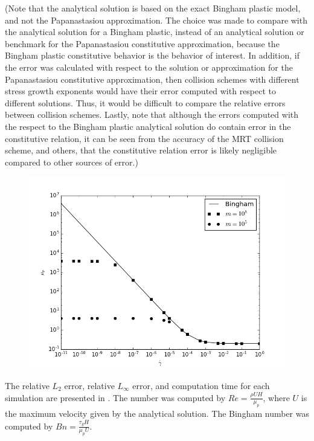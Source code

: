 (Note that the analytical solution is based on the exact Bingham plastic model, and not the Papanastasiou approximation.
The choice was made to compare with the analytical solution for a Bingham plastic, instead of an analytical solution or benchmark for the Papanastasiou constitutive approximation, because the Bingham plastic constitutive behavior is the behavior of interest. In addition, if the error was calculated with respect to the solution or approximation for the Papanastasiou constitutive approximation, then collision schemes with different stress growth exponents would have their error computed with respect to different solutions. Thus, it would be difficult to compare the relative errors between collision schemes. Lastly, note that although the errors computed with the respect to the Bingham plastic analytical solution do contain error in the constitutive relation, it can be seen from the accuracy of the MRT collision scheme, and others, that the constitutive relation error is likely negligible compared to other sources of error.)

\DIFaddbegin \begin{figure}
	\centering
	\includegraphics[width=\linewidth]{figs/viscosity_yield-stress}
	\caption{}
	\label{fig:viscosity}
\end{figure}

\DIFaddend The relative $L_2$ error, relative $L_{\infty}$ error, and computation time for each simulation are presented in .
The \DIFdelbegin {}\DIFdelend \DIFaddbegin {}\DIFaddend number was computed by $Re = \frac{\rho U H}{\mu_p}$, where $U$ is the maximum velocity given by the analytical solution.
The Bingham number was computed by $Bn = \frac{\tau_y H}{\mu_p U}$.
\DIFaddbegin {}\DIFaddend 

